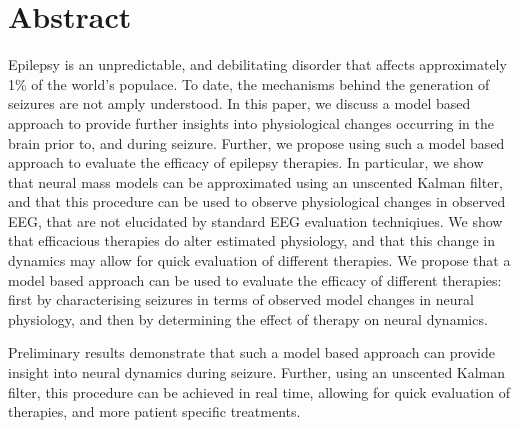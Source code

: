 \section{Abstract}

Epilepsy is an unpredictable, and debilitating disorder that affects approximately 1\% of the world's populace. To date, the mechanisms behind the generation of seizures are not amply understood. In this paper, we discuss a model based approach to provide further insights into physiological changes occurring in the brain prior to, and during seizure. Further, we propose using such a model based approach to evaluate the efficacy of epilepsy therapies. In particular, we show that neural mass models can be approximated using an unscented Kalman filter, and that this procedure can be used to observe physiological changes in observed EEG, that are not elucidated by standard EEG evaluation techniqiues. We show that efficacious therapies do alter estimated physiology, and that this change in dynamics may allow for quick evaluation of different therapies. We propose that a model based approach can be used to evaluate the efficacy of different therapies: first by characterising seizures in terms of observed model changes in neural physiology, and then by determining the effect of therapy on neural dynamics.

Preliminary results demonstrate that such a model based approach can provide insight into neural dynamics during seizure. Further, using an unscented Kalman filter, this procedure can be achieved in real time, allowing for quick evaluation of therapies, and more patient specific treatments.